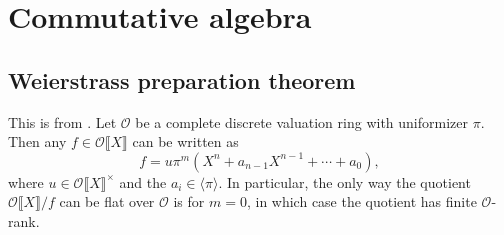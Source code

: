 \documentclass{amsart}
\newcommand{\cO}{\mathcal{O}}
\begin{document}
\section{Commutative algebra}


\subsection{Weierstrass preparation theorem}

This is from \cite[VII \S 3.8, pr.6]{bourbaki-comm-alg}. Let $\cO$ be a 
complete discrete valuation ring with uniformizer $\pi$. Then any 
$f\in \cO\llbracket X\rrbracket$ can be written as 
\[
  f = u \pi^m \left(X^n+a_{n-1} X^{n-1} + \cdots + a_0\right),
\]
where $u\in \cO\llbracket X\rrbracket^\times$ and the 
$a_i\in \langle \pi\rangle$. In particular, the only way the quotient 
$\cO\llbracket X\rrbracket/f$ can be flat over $\cO$ is for 
$m=0$, in which case the quotient has finite $\cO$-rank. 







\end{document}
